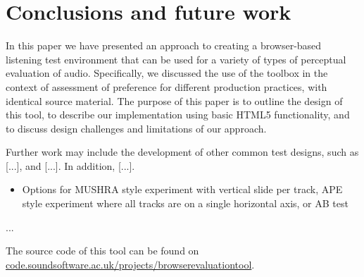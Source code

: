 \documentclass{article}
\begin{document}
\section{Conclusions and future work}\label{sec:conclusions}

In this paper we have presented an approach to creating a browser-based listening test environment that can be used for a variety of types of perceptual evaluation of audio. 
Specifically, we discussed the use of the toolbox in the context of assessment of preference for different production practices, with identical source material. 
The purpose of this paper is to outline the design of this tool, to describe our implementation using basic HTML5 functionality, and to discuss design challenges and limitations of our approach. %

Further work may include the development of other common test designs, such as [...], and [...]. In addition, [...]. 

\begin{itemize}
\item Options for MUSHRA style experiment with vertical slide per track, APE style experiment where all tracks are on a single horizontal axis, or AB test
\end{itemize}


...

The source code of this tool can be found on \url{code.soundsoftware.ac.uk/projects/browserevaluationtool}.



\end{document}
